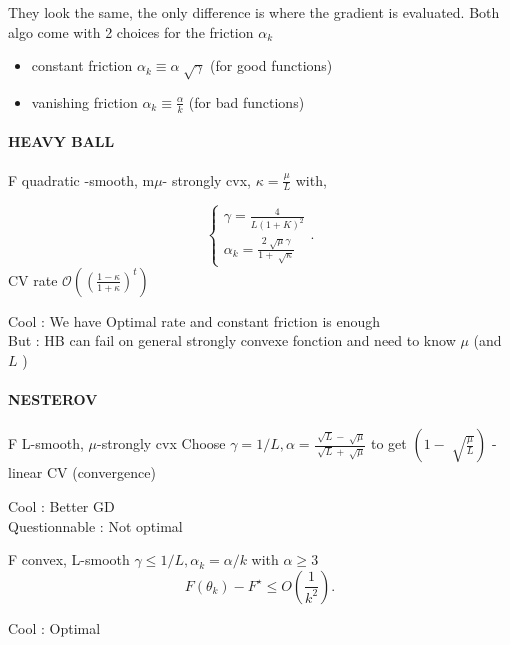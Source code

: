 \begin{note}
    They look the same, the only difference is where the gradient is evaluated. Both algo come with 2 choices for the friction $ \alpha _k $ \begin{itemize}
        \item constant friction $ \alpha _k \equiv \alpha \sqrt[]{\gamma } $ (for good functions)
        \item vanishing friction  $ \alpha _k \equiv \frac{\alpha}{k}  $ (for bad functions)
    \end{itemize}
\end{note}

\paragraph*{HEAVY BALL}
\begin{thm}
    F quadratic -smooth, m$\mu$- strongly cvx, $\kappa = \frac{\mu }{L}$ with,

    \[
        \begin{cases}
            \gamma = \frac{4}{L(1+K)^2} \\
             \alpha _k = \frac{2 \sqrt[]{\mu } \gamma }{1 + \sqrt[]{\kappa }}
        \end{cases} 
    .\]
    CV rate $\mathcal{O}((\frac{1 - \kappa }{1 + \kappa })^t )$

    Cool : We have Optimal rate and constant friction is enough \\
    But : HB can fail on general strongly convexe fonction and need to know $ \mu  $  (and $ L $ )
\end{thm}

\paragraph*{NESTEROV}
\begin{thm}[]
    F L-smooth, $\mu$-strongly cvx
    Choose $ \gamma  = 1/L, \alpha = \frac{\sqrt[]{L} - \sqrt[]{\mu }}{ \sqrt[]{L} + \sqrt[]{\mu }} $ to get $ (1 - \sqrt[]{\frac{\mu }{L}}) $ -linear CV (convergence)

    Cool : Better GD \\
    Questionnable : Not optimal
\end{thm}

\begin{thm}
    F convex, L-smooth
    $ \gamma \leq 1/L, \alpha _k = \alpha / k $ with $ \alpha \geq 3 $ 
    \[
        F(\theta _k) - F^\star \leq O(\frac{1}{k^2})
    .\]
    
    Cool : Optimal
\end{thm}

